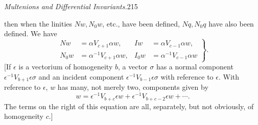 \documentclass[11pt]{article}
\begin{document}
\newpage\thispagestyle{empty}\begin{center}\textit{Multenions and Differential Invariants.}\hfill 215\end{center}
then when the linities $Nw,N_0w$, etc., have been defined, $Nq,N_0q$ have also been defined. We have
\begin{equation}\left.\begin{aligned}Nw&=\alpha V_{c+1}\alpha w,&Iw&=\alpha V_{c-1}\alpha w,\\N_0w&=\alpha^{-1}V_{c+1}\alpha w,&I_0w&=\alpha^{-1}V_{c-1}\alpha w\end{aligned}\right\}.\tag{3}\end{equation}
[If $\epsilon$ is a vectorium of homogeneity $b$, a vector $\sigma$ has a normal component $\epsilon^{-1}V_{b+1}\epsilon\sigma$ and an incident component $\epsilon^{-1}V_{b-1}\epsilon\sigma$ with reference to $\epsilon$. With reference to $\epsilon$, $w$ has many, not merely two, components given by
\[
w=\epsilon^{-1}V_{b+c}\epsilon w+\epsilon^{-1}V_{b+c-2}\epsilon w+\cdots.
\]
The terms on the right of this equation are all, separately, but not obviously, of homogeneity $c$.]
\end{document}
